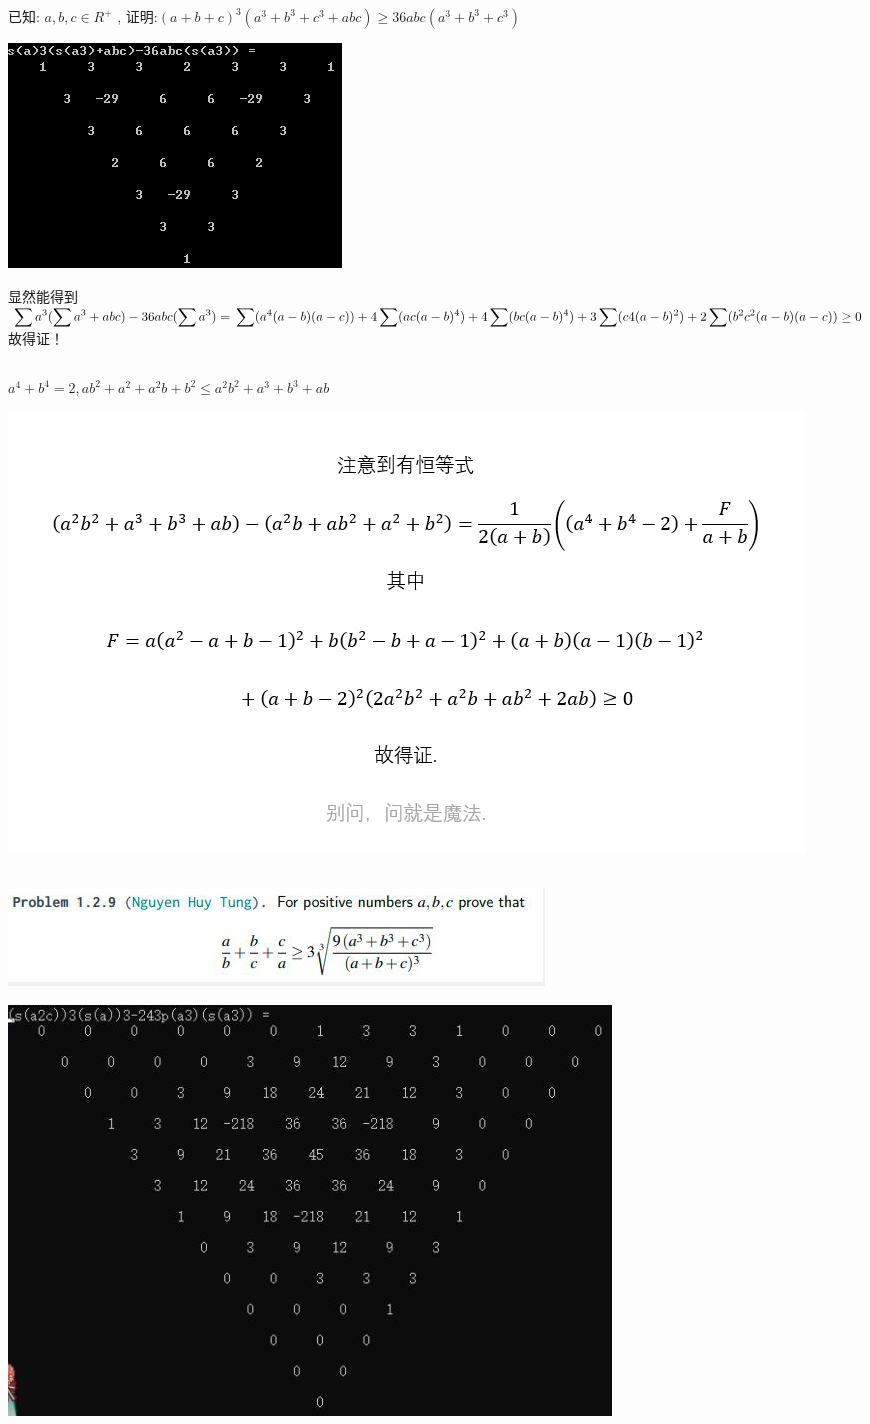 \documentclass[UTF8]{ctexart}
\begin{document}
\subsection{}
已知:  $ a, b, c \in R^{+} $ , 证明:$ (a+b+c)^{3}(a^{3}+b^{3}+c^{3}+a b c) \geq 36 a b c(a^{3}+b^{3}+c^{3}) $
\begin{center}
	\includegraphics[width=0.5\linewidth]{a34}
\end{center}
显然能得到$\displaystyle \sum  a^{3}(\displaystyle \sum  a^{3}+abc)-36abc(\displaystyle \sum  a^{3})=\\
\displaystyle \sum  (a^{4}(a-b)(a-c))+4\displaystyle \sum  (ac(a-b)^{4})+4\displaystyle \sum  (bc(a-b)^{4})+3\displaystyle \sum  (c4(a-b)^{2})+2\displaystyle \sum  (b^{2}c^{2}(a-b)(a-c))\ge 0$故得证！
\subsection{}
$ a^4+b^4=2,
ab^2+a^2+a^2b+b^2 \le a^2b^2+a^3+b^3+ab $
\begin{center}
	\includegraphics[width=0.5\linewidth]{a37}
\end{center}

\subsection{}
\begin{center}
	\includegraphics[width=0.5\linewidth]{a35}
\end{center}
\begin{center}
	\includegraphics[width=0.5\linewidth]{a36}
\end{center}
\end{document}
